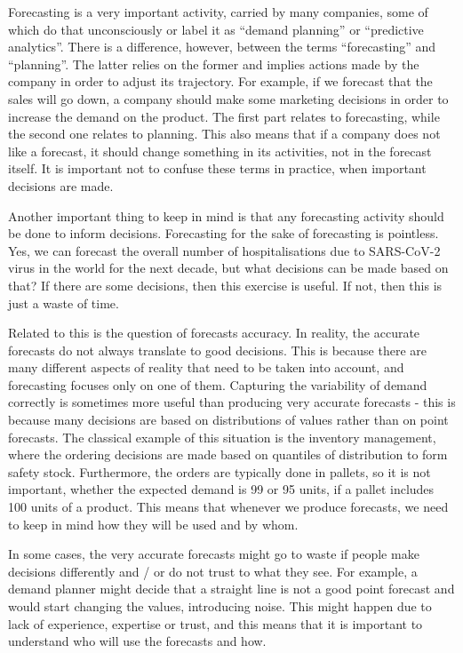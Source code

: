 \documentclass[
]{book}
\theoremstyle{definition}
\theoremstyle{definition}
\theoremstyle{definition}
\theoremstyle{definition}
\theoremstyle{remark}
\begin{document}
Forecasting is a very important activity, carried by many companies, some of which do that unconsciously or label it as ``demand planning'' or ``predictive analytics''. There is a difference, however, between the terms ``forecasting'' and ``planning''. The latter relies on the former and implies actions made by the company in order to adjust its trajectory. For example, if we forecast that the sales will go down, a company should make some marketing decisions in order to increase the demand on the product. The first part relates to forecasting, while the second one relates to planning. This also means that if a company does not like a forecast, it should change something in its activities, not in the forecast itself. It is important not to confuse these terms in practice, when important decisions are made.

Another important thing to keep in mind is that any forecasting activity should be done to inform decisions. Forecasting for the sake of forecasting is pointless. Yes, we can forecast the overall number of hospitalisations due to SARS-CoV-2 virus in the world for the next decade, but what decisions can be made based on that? If there are some decisions, then this exercise is useful. If not, then this is just a waste of time.

Related to this is the question of forecasts accuracy. In reality, the accurate forecasts do not always translate to good decisions. This is because there are many different aspects of reality that need to be taken into account, and forecasting focuses only on one of them. Capturing the variability of demand correctly is sometimes more useful than producing very accurate forecasts - this is because many decisions are based on distributions of values rather than on point forecasts. The classical example of this situation is the inventory management, where the ordering decisions are made based on quantiles of distribution to form safety stock. Furthermore, the orders are typically done in pallets, so it is not important, whether the expected demand is 99 or 95 units, if a pallet includes 100 units of a product. This means that whenever we produce forecasts, we need to keep in mind how they will be used and by whom.

In some cases, the very accurate forecasts might go to waste if people make decisions differently and / or do not trust to what they see. For example, a demand planner might decide that a straight line is not a good point forecast and would start changing the values, introducing noise. This might happen due to lack of experience, expertise or trust, and this means that it is important to understand who will use the forecasts and how.
\end{document}
